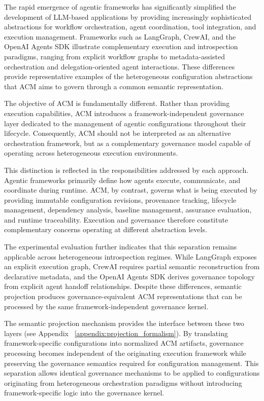 \documentclass[10pt]{article}
\begin{document}
The rapid emergence of agentic frameworks has significantly simplified the development of LLM-based applications by providing increasingly sophisticated abstractions for workflow orchestration, agent coordination, tool integration, and execution management. Frameworks such as LangGraph, CrewAI, and the OpenAI Agents SDK illustrate complementary execution and introspection paradigms, ranging from explicit workflow graphs to metadata-assisted orchestration and delegation-oriented agent interactions. These differences provide representative examples of the heterogeneous configuration abstractions that ACM aims to govern through a common semantic representation.

The objective of ACM is fundamentally different. Rather than providing execution capabilities, ACM introduces a framework-independent governance layer dedicated to the management of agentic configurations throughout their lifecycle. Consequently, ACM should not be interpreted as an alternative orchestration framework, but as a complementary governance model capable of operating across heterogeneous execution environments.

This distinction is reflected in the responsibilities addressed by each approach. Agentic frameworks primarily define how agents execute, communicate, and coordinate during runtime. ACM, by contrast, governs what is being executed by providing immutable configuration revisions, provenance tracking, lifecycle management, dependency analysis, baseline management, assurance evaluation, and runtime traceability. Execution and governance therefore constitute complementary concerns operating at different abstraction levels.

The experimental evaluation further indicates that this separation remains applicable across heterogeneous introspection regimes. While LangGraph exposes an explicit execution graph, CrewAI requires partial semantic reconstruction from declarative metadata, and the OpenAI Agents SDK derives governance topology from explicit agent handoff relationships. Despite these differences, semantic projection produces governance-equivalent ACM representations that can be processed by the same framework-independent governance kernel.

The semantic projection mechanism provides the interface between these two layers (see Appendix ~\ref{appendix:projection_formalism}). By translating framework-specific configurations into normalized ACM artifacts, governance processing becomes independent of the originating execution framework while preserving the governance semantics required for configuration management. This separation allows identical governance mechanisms to be applied to configurations originating from heterogeneous orchestration paradigms without introducing framework-specific logic into the governance kernel.
\end{document}
